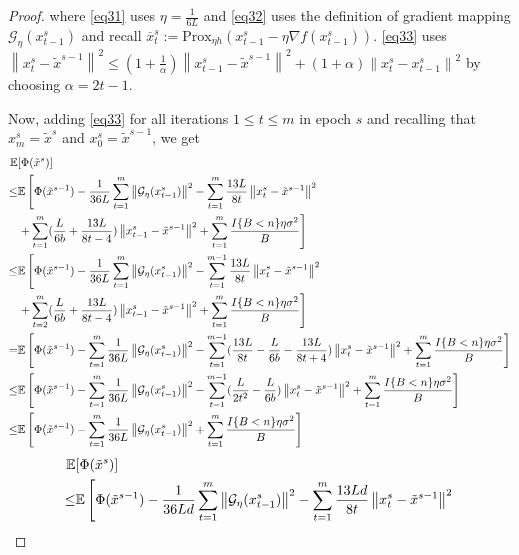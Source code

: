 \documentclass{article}
\newcommand*{\G}{\mathcal{G}}
\newcommand*{\Po}{\text{Prox}}
\newcommand*{\E}{\mathbb{E}}
\newcommand{\norm}[1]{\left\lVert#1\right\rVert}
\theoremstyle{definition}
\theoremstyle{remark}
\begin{document}
\begin{proof}
 where \eqref{eq31} uses $\eta = \frac{1}{6L}$ and \eqref{eq32} uses the definition of gradient mapping $\G_{\eta}(x_{t-1}^s)$ and recall $\overline{x}_t^s := \Po_{\eta h}(x_{t-1}^s - \eta \nabla f(x_{t-1}^s))$. \eqref{eq33} uses $\norm{{x}_t^s-\tilde{x}^{s-1}}^2 \leq (1+\frac{1}{\alpha})\norm{{x}_{t-1}^s-\tilde{x}^{s-1}}^2 + (1+\alpha) \norm{{x}_t^s-x_{t-1}^s}^2$ by choosing $\alpha = 2t-1$.
 
Now, adding \eqref{eq33} for all iterations $1 \leq t \leq m$ in epoch $s$ and recalling that $x_m^s = \tilde{x}^s$ and $x_0^s = \tilde{x}^{s-1}$, we get
\begin{align} 
\E&[\Phi(\tilde{x}^s)]\notag 
\\  
\leq& \E\left[\Phi(\tilde{x}^{s-1}) - \frac{1}{36 L}\sum_{t=1}^m\norm{\G_{\eta}(x_{t-1}^s)}^2 -\sum_{t=1}^{m}\frac{13L}{8t}\norm{{x}_t^s-\tilde{x}^{s-1}}^2\right.\notag\\
&\left.+\sum_{t=1}^m(\frac{L}{6b}+\frac{13L}{8t-4}) \norm{x_{t-1}^s-\tilde{x}^{s-1}}^2 + \sum_{t=1}^m\frac{I\{B < n\}\eta \sigma ^2}{B}\right]\notag\\
\leq& \E\left[\Phi(\tilde{x}^{s-1}) - \frac{1}{36 L}\sum_{t=1}^m\norm{\G_{\eta}(x_{t-1}^s)}^2 -\sum_{t=1}^{m-1}\frac{13L}{8t}\norm{{x}_t^s-\tilde{x}^{s-1}}^2\right.\notag\\
&\left.+\sum_{t=2}^m(\frac{L}{6b}+\frac{13L}{8t-4}) \norm{x_{t-1}^s-\tilde{x}^{s-1}}^2 + \sum_{t=1}^m\frac{I\{B < n\}\eta \sigma ^2}{B}\right]\label{eq34}\\
=& \E\left[\Phi(\tilde{x}^{s-1}) - \sum_{t=1}^m\frac{1}{36 L}\norm{\G_{\eta}(x_{t-1}^s)}^2 -\sum_{t=1}^{m-1}(\frac{13L}{8t}- \frac{L}{6b} - \frac{13L}{8t+4})\norm{{x}_t^s-\tilde{x}^{s-1}}^2+ \sum_{t=1}^m\frac{I\{B < n\}\eta \sigma ^2}{B}\right]\notag\\
\leq& \E\left[\Phi(\tilde{x}^{s-1}) - \sum_{t=1}^m\frac{1}{36 L}\norm{\G_{\eta}(x_{t-1}^s)}^2 -\sum_{t=1}^{m-1}(\frac{L}{2t^2}- \frac{L}{6b})\norm{{x}_t^s-\tilde{x}^{s-1}}^2+ \sum_{t=1}^m\frac{I\{B < n\}\eta \sigma ^2}{B}\right]\notag\\
\leq& \E\left[\Phi(\tilde{x}^{s-1}) - \sum_{t=1}^m\frac{1}{36 L}\norm{\G_{\eta}(x_{t-1}^s)}^2 + \sum_{t=1}^m\frac{I\{B < n\}\eta \sigma ^2}{B}\right]\label{eq35}
 \end{align}
 {\color{blue}
  \begin{align} 
\E&[\Phi(\tilde{x}^s)]\notag 
\\  
\leq& \E\left[\Phi(\tilde{x}^{s-1}) - \frac{1}{36 Ld}\sum_{t=1}^m\norm{\G_{\eta}(x_{t-1}^s)}^2 -\sum_{t=1}^{m}\frac{13Ld}{8t}\norm{{x}_t^s-\tilde{x}^{s-1}}^2\right.\notag\\

\end{align}}
\end{proof}
\end{document}
